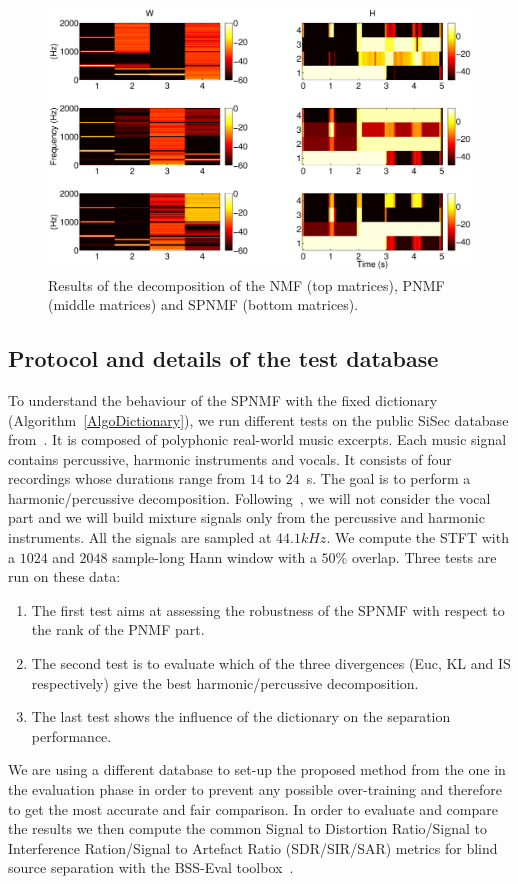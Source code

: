 \begin{figure}
   
	\centering    
  \includegraphics[width=15cm]{fig/WHcomp.eps}

\caption{\label{resultONMF2} Results of the decomposition of the NMF (top matrices), PNMF (middle matrices) and SPNMF (bottom matrices).}


\end{figure}


\subsection{Protocol and details of the test database}


To understand the behaviour of the SPNMF with the fixed dictionary (Algorithm~\ref{AlgoDictionary}), we run different tests on the public SiSec database from~\cite{SiSec10}. It is composed of polyphonic real-world music excerpts. Each music signal contains percussive, harmonic instruments and vocals. It consists of four recordings whose durations range from $14$ to $24$~s. The goal is to perform a harmonic/percussive decomposition. Following~\cite{canadas2014percussive}, we will not consider the vocal part and we will build mixture signals only from the percussive and harmonic instruments. All the signals are sampled at $44.1kHz$. We compute the STFT with a $1024$ and $2048$ sample-long Hann window with a $50\%$ overlap.
Three tests are run on these data:
\begin{enumerate}
	\item The first test aims at assessing the robustness of the SPNMF with respect to the rank of the PNMF part. 
	\item The second test is to evaluate which of the three divergences (Euc, KL and IS respectively) give the best harmonic/percussive decomposition.
	\item The last test shows the influence of the dictionary on the separation performance. 
\end{enumerate} 
We are using a different database to set-up the proposed method from the one in the evaluation phase in order to prevent any possible over-training and therefore to get the most accurate and fair comparison. 
In order to evaluate and compare the results we then compute the common Signal to Distortion Ratio/Signal to Interference Ration/Signal to Artefact Ratio (SDR/SIR/SAR) metrics for blind source separation with the BSS-Eval toolbox~\cite{bsseval}. 


